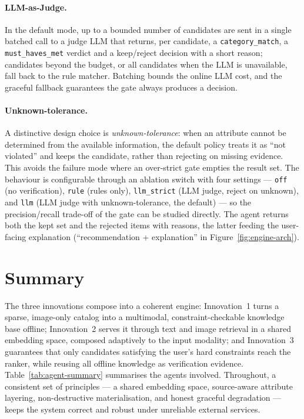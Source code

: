 \paragraph{LLM-as-Judge.}
In the default mode, up to a bounded number of candidates are sent in a single
batched call to a judge LLM that returns, per candidate, a
\texttt{category\_match}, a \texttt{must\_haves\_met} verdict and a keep/reject
decision with a short reason; candidates beyond the budget, or all candidates
when the LLM is unavailable, fall back to the rule matcher. Batching bounds the
online LLM cost, and the graceful fallback guarantees the gate always produces a
decision.

\paragraph{Unknown-tolerance.}
A distinctive design choice is \emph{unknown-tolerance}: when an attribute cannot
be determined from the available information, the default policy treats it as
``not violated'' and keeps the candidate, rather than rejecting on missing
evidence. This avoids the failure mode where an over-strict gate empties the
result set. The behaviour is configurable through an ablation switch with four
settings --- \texttt{off} (no verification), \texttt{rule} (rules only),
\texttt{llm\_strict} (LLM judge, reject on unknown), and \texttt{llm} (LLM judge
with unknown-tolerance, the default) --- so the precision/recall trade-off of the
gate can be studied directly. The agent returns both the kept set and the
rejected items with reasons, the latter feeding the user-facing explanation
(``recommendation + explanation'' in Figure~\ref{fig:engine-arch}).

\section{Summary}
\label{sec:engine-summary}

The three innovations compose into a coherent engine: Innovation~1 turns a
sparse, image-only catalog into a multimodal, constraint-checkable knowledge base
offline; Innovation~2 serves it through text and image retrieval in a shared
embedding space, composed adaptively to the input modality; and Innovation~3
guarantees that only candidates satisfying the user's hard constraints reach the
ranker, while reusing all offline knowledge as verification evidence.
Table~\ref{tab:agent-summary} summarises the agents involved. Throughout, a
consistent set of principles --- a shared embedding space, source-aware attribute
layering, non-destructive materialisation, and honest graceful degradation ---
keeps the system correct and robust under unreliable external services.

